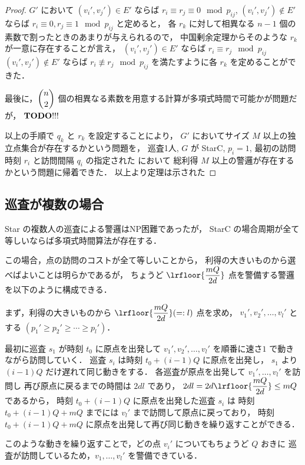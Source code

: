 \begin{proof}
	$G'$ において
	$(v_i', v_j') \in E'$     ならば $r_i \equiv r_j \equiv 0 \mod p_{ij}$,
	$(v_i', v_j') \not\in E'$ ならば $r_i \equiv 0, r_j \equiv 1 \mod p_{ij}$
	と定めると，
	各 $r_k$ に対して相異なる $n - 1$ 個の素数で割ったときのあまりが与えられるので，
	中国剰余定理からそのような $r_k$ が一意に存在することが言え，
	$(v_i', v_j') \in E'$ ならば $r_i \equiv r_j \mod p_{ij}$
	$(v_i', v_j') \not\in E'$ ならば $r_i \not\equiv r_j \mod p_{ij}$
	を満たすように各 $r_k$ を定めることができた．

	最後に，$\dbinom{n}{2}$ 個の相異なる素数を用意する計算が多項式時間で可能かが問題だが，
	${\bf TODO!!!}$ 

	以上の手順で $q_k$ と $r_k$ を設定することにより，
	$G'$ においてサイズ $M$ 以上の独立点集合が存在するかという問題を，
	巡査1人, $G$ が StarC, $p_i = 1$,
	最初の訪問時刻 $r_i$ と訪問間隔 $q_i$ の指定された \maxprofit において
	総利得 $M$ 以上の警邏が存在するかという問題に帰着できた．
	以上より定理は示された
\end{proof}






\subsection{巡査が複数の場合}

Star の複数人の巡査による警邏はNP困難であったが，
StarC の場合周期が全て等しいならば多項式時間算法が存在する．

この場合，点の訪問のコストが全て等しいことから，
利得の大きいものから選べばよいことは明らかであるが，
ちょうど $\lrfloor{\dfrac{mQ}{2d}}$ 点を警備する警邏を以下のように構成できる．

まず，利得の大きいものから $\lrfloor{\dfrac{mQ}{2d}} (=: l)$ 点を求め，
$v_1', v_2', \ldots, v_l'$ とする 
$(p_1' \geq p_2' \geq \cdots \geq p_l')$．

最初に巡査 $s_1$ が時刻 $t_0$ に原点を出発して
$v_1', v_2', \ldots, v_l'$ を順番に速さ$1$ で動きながら訪問していく．
巡査 $s_i$ は時刻 $t_0 + (i - 1)Q$ に原点を出発し，
$s_1$ より $(i - 1)Q$ だけ遅れて同じ動きをする．
各巡査が原点を出発して $v_1', \ldots, v_l'$ を訪問し
再び原点に戻るまでの時間は $2dl$ であり，
$2dl = 2d \lrfloor{\dfrac{mQ}{2d}} \leq mQ$ であるから，
時刻 $t_0 + (i - 1)Q$ に原点を出発した巡査 $s_i$ は
時刻 $t_0 + (i - 1)Q + mQ$ までには $v_l'$ まで訪問して原点に戻っており，
時刻 $t_0 + (i - 1)Q + mQ$ に原点を出発して再び同じ動きを繰り返すことができる．

このような動きを繰り返すことで，どの点 $v_i'$ についてもちょうど $Q$ おきに
巡査が訪問しているため，$v_1, \ldots, v_l'$ を警備できている．


